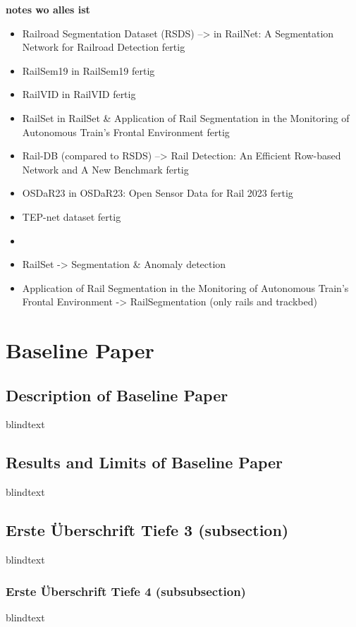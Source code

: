 \textbf{notes wo alles ist}

\begin{itemize}
    \item Railroad Segmentation Dataset (RSDS) --> in RailNet: A Segmentation Network for Railroad Detection fertig
    \item RailSem19 in RailSem19 fertig
    \item RailVID in RailVID fertig
    \item RailSet in RailSet \& Application of Rail Segmentation in the Monitoring of Autonomous Train’s Frontal Environment fertig
    \item Rail-DB (compared to RSDS) --> Rail Detection: An Efficient Row-based Network and A New Benchmark fertig
    \item OSDaR23 in OSDaR23: Open Sensor Data for Rail 2023 fertig
    \item TEP-net dataset fertig
    \item
    \item RailSet -> Segmentation \& Anomaly detection
    \item Application of Rail Segmentation in the Monitoring of Autonomous Train’s Frontal Environment -> RailSegmentation (only rails and trackbed)
\end{itemize}









\clearpage                                                       %



\section{Baseline Paper}



\subsection{Description of Baseline Paper}
blindtext

\subsection{Results and Limits of Baseline Paper}
blindtext

\subsection{Erste Überschrift Tiefe 3 (subsection)}
blindtext

\subsubsection{Erste Überschrift Tiefe 4 (subsubsection)}
blindtext